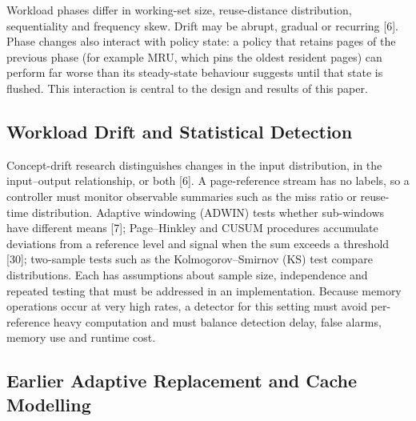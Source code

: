 \documentclass[10pt,twocolumn,a4paper]{IEEEtran}
\begin{document}
Workload phases differ in working-set size, reuse-distance distribution,
sequentiality and frequency skew. Drift may be abrupt, gradual or recurring
[6]. Phase changes also interact with policy state: a policy that retains
pages of the previous phase (for example MRU, which pins the oldest resident
pages) can perform far worse than its steady-state behaviour suggests until
that state is flushed. This interaction is central to the design and results
of this paper.

\subsection{Workload Drift and Statistical Detection}

Concept-drift research distinguishes changes in the input distribution, in the
input--output relationship, or both [6]. A page-reference stream has no
labels, so a controller must monitor observable summaries such as the miss
ratio or reuse-time distribution. Adaptive windowing (ADWIN) tests whether
sub-windows have different means [7]; Page--Hinkley and CUSUM procedures
accumulate deviations from a reference level and signal when the sum exceeds a
threshold [30]; two-sample tests such as the Kolmogorov--Smirnov (KS) test
compare distributions. Each has assumptions about sample size, independence
and repeated testing that must be addressed in an implementation. Because
memory operations occur at very high rates, a detector for this setting must
avoid per-reference heavy computation and must balance detection delay, false
alarms, memory use and runtime cost.

\subsection{Earlier Adaptive Replacement and Cache Modelling}
\end{document}
